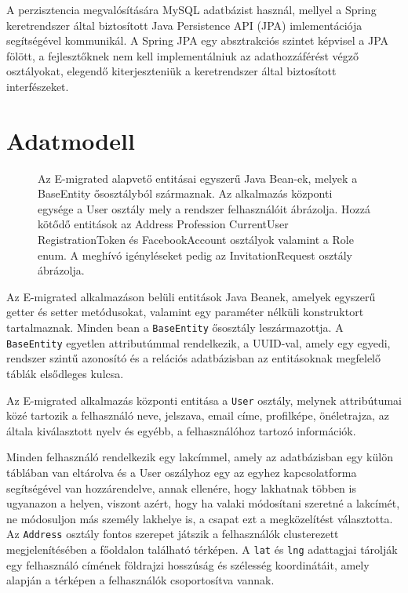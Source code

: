 A perzisztencia megvalósítására MySQL adatbázist használ, mellyel a Spring keretrendszer által biztosított Java Persistence API (JPA) imlementációja segítségével kommunikál. A Spring JPA egy absztrakciós szintet képvisel a JPA fölött, a fejlesztőknek nem kell implementálniuk az adathozzáférést végző osztályokat, elegendő kiterjeszteniük a keretrendszer által biztosított interfészeket. 



\section{Adatmodell}\label{sec:projektrol:adatmodell}
\begin{figure}[!t]
  \centering
  \caption{Az E-migrated alapvető entitásai egyszerű Java Bean-ek, melyek a BaseEntity ősosztályból származnak. Az alkalmazás központi egysége a User osztály\protect{,} mely a rendszer felhasználóit ábrázolja. Hozzá kötődő entitások az Address\protect{,} Profession\protect{,} CurrentUser\protect{,} RegistrationToken és FacebookAccount osztályok\protect{,} valamint a Role enum. A meghívó igényléseket pedig az InvitationRequest osztály ábrázolja.}
  \label{fig:adatmodell}
\end{figure}

Az E-migrated alkalmazáson belüli entitások Java Beanek, amelyek egyszerű getter és setter
metódusokat, valamint egy paraméter nélküli konstruktort tartalmaznak. Minden bean a \texttt{BaseEntity} ősosztály leszármazottja. A \texttt{BaseEntity} egyetlen attributúmmal rendelkezik, a UUID-val, amely egy egyedi, rendszer szintű azonosító és a relációs adatbázisban az entitásoknak megfelelő táblák elsődleges kulcsa. 

Az E-migrated alkalmazás központi entitása a \texttt{User} osztály,  melynek attribútumai közé tartozik a felhasználó neve, jelszava, email címe, profilképe, önéletrajza, az általa kiválasztott nyelv és egyébb, a felhasználóhoz tartozó információk. 



Minden felhasználó rendelkezik egy lakcímmel, amely az adatbázisban egy külön táblában van eltárolva és a User oszályhoz egy az egyhez kapcsolatforma segítségével van hozzárendelve, annak ellenére, hogy lakhatnak többen is ugyanazon a helyen, viszont azért, hogy ha valaki módosítani szeretné a lakcímét, ne módosuljon más személy lakhelye is, a csapat ezt a megközelítést választotta. Az \texttt{Address} osztály fontos szerepet játszik a felhasználók clusterezett megjelenítésében a főoldalon található térképen. A \texttt{lat} és \texttt{lng} adattagjai tárolják egy felhasználó címének földrajzi hosszúság és szélesség koordinátáit, amely alapján a térképen a felhasználók csoportosítva vannak. 

